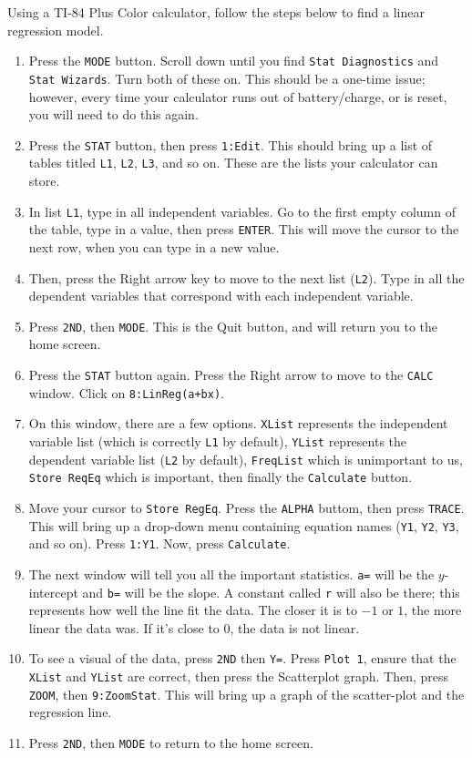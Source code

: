 \documentclass[../book.tex]{subfiles}
\begin{document}
Using a TI-84 Plus Color calculator, follow the steps below to find a linear regression model. \begin{enumerate}
    \item Press the \texttt{MODE} button.  Scroll down until you find \texttt{Stat Diagnostics} and \texttt{Stat Wizards}.  Turn both of these on.  This should be a one-time issue; however, every time your calculator runs out of battery/charge, or is reset, you will need to do this again.
    \item Press the \texttt{STAT} button, then press \texttt{1:Edit}. This should bring up a list of tables titled \texttt{L1}, \texttt{L2}, \texttt{L3}, and so on.  These are the lists your calculator can store.
    \item In list \texttt{L1}, type in all independent variables.  Go to the first empty column of the table, type in a value, then press \texttt{ENTER}.  This will move the cursor to the next row, when you can type in a new value.
    \item Then, press the Right arrow key to move to the next list (\texttt{L2}).  Type in all the dependent variables that correspond with each independent variable.
    \item Press \texttt{2ND}, then \texttt{MODE}.  This is the Quit button, and will return you to the home screen.
    \item Press the \texttt{STAT} button again. Press the Right arrow to move to the \texttt{CALC} window.  Click on \texttt{8:LinReg(a+bx)}.
    \item On this window, there are a few options.  \texttt{XList} represents the independent variable list (which is correctly \texttt{L1} by default), \texttt{YList} represents the dependent variable list (\texttt{L2} by default), \texttt{FreqList} which is unimportant to us, \texttt{Store ReqEq} which is important, then finally the \texttt{Calculate} button.
    \item Move your cursor to \texttt{Store RegEq}.  Press the \texttt{ALPHA} buttom, then press \texttt{TRACE}.  This will bring up a drop-down menu containing equation names (\texttt{Y1}, \texttt{Y2}, \texttt{Y3}, and so on).  Press \texttt{1:Y1}.  Now, press \texttt{Calculate}.
    \item The next window will tell you all the important statistics.  \texttt{a=} will be the $y$-intercept and \texttt{b=} will be the slope.  A constant called \texttt{r} will also be there; this represents how well the line fit the data.  The closer it is to $-1$ or $1$, the more linear the data was.  If it's close to $0$, the data is not linear.
    \item To see a visual of the data, press \texttt{2ND} then \texttt{Y=}.  Press \texttt{Plot 1}, ensure that the \texttt{XList} and \texttt{YList} are correct, then press the Scatterplot graph.  Then, press \texttt{ZOOM}, then \texttt{9:ZoomStat}.  This will bring up a graph of the scatter-plot and the regression line.
    \item Press \texttt{2ND}, then \texttt{MODE} to return to the home screen.
\end{enumerate}
\end{document}
